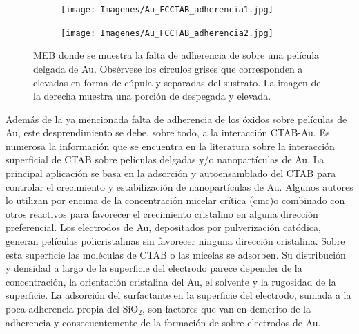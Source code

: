 	     
				\begin{figure}[b!]
		 	   	    \begin{subfigure}[t]{0.49\textwidth}
			        	\texttt{[image: Imagenes/Au\_FCCTAB\_adherencia1.jpg]}
			       		\end{subfigure}
					\begin{subfigure}[t]{0.49\textwidth}
			 	   	    \texttt{[image: Imagenes/Au\_FCCTAB\_adherencia2.jpg]}
			       		\end{subfigure}
					 \caption[Adherencia de CTAB sobre electrodos.]{MEB donde se muestra la falta de adherencia de \pdmC\space sobre una película delgada de Au. Obsérvese los círculos grises que corresponden a \pdm\space elevadas en forma de cúpula y separadas del sustrato. La imagen de la derecha muestra una porción de \pdmC\space despegada y elevada.}
					 \label{fig:CTAB_adherencia}	
				     \end{figure}
			
			Además de la ya mencionada falta de adherencia de los óxidos sobre películas de Au, este desprendimiento se debe, sobre todo, a la interacción CTAB-Au. Es numerosa la información que se encuentra en la literatura sobre la interacción superficial de CTAB sobre películas delgadas y/o nanopartículas de Au. La principal aplicación se basa en la adsorción y autoensamblado del CTAB para controlar el crecimiento y estabilización de nanopartículas de Au. \cite{Cheng2003,Smith2008,Meena2013,Wang2013,Hamon2009} Algunos autores lo utilizan por encima de la concentración micelar crítica (cmc)\cite{Lim2014}o combinado con otros reactivos para favorecer el crecimiento cristalino en alguna dirección preferencial\cite{Smith2009}. Los electrodos de Au, depositados por pulverización catódica, generan películas policristalinas sin favorecer ninguna dirección cristalina.\cite{Svorcik2010,Bechelany2010} Sobre esta superficie las moléculas de CTAB o las micelas se adsorben. Su distribución y densidad a largo de la superficie del electrodo parece depender de la concentración, la orientación cristalina del Au, el solvente y la rugosidad de la superficie\cite{Meena2013,Lim2014}. La adsorción del surfactante en la superficie del electrodo, sumada a la poca adherencia propia del SiO$_2$\cite{Kern1990,Hieber1976}, son factores que van en demerito de la adherencia y consecuentemente de la formación de \pdmC\space sobre electrodos de Au. 
			
